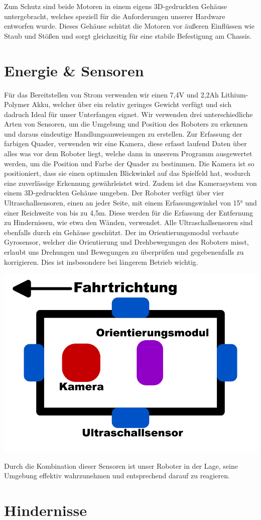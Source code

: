 \documentclass{article}
\begin{document}
Zum Schutz sind beide Motoren in einem eigens 3D-gedruckten Gehäuse untergebracht,
welches speziell für die Anforderungen unserer Hardware entworfen wurde.
Dieses Gehäuse schützt die Motoren vor äußeren Einflüssen wie Staub und Stößen und sorgt gleichzeitig für eine stabile Befestigung am Chassis.

\section{Energie \& Sensoren}
Für das Bereitstellen von Strom verwenden wir einen 7,4V und 2,2Ah Lithium-Polymer Akku, welcher über ein relativ geringes Gewicht verfügt
und sich dadruch Ideal für unser Unterfangen eignet.\newline
Wir verwenden drei unterschiedliche Arten von Sensoren, um die Umgebung und Position des Roboters zu erkennen und daraus eindeutige Handlungsanweisungen
zu erstellen.\newline
Zur Erfassung der farbigen Quader, verwenden wir eine Kamera, diese erfasst laufend Daten über alles was vor dem Roboter liegt,
welche dann in unserem Programm ausgewertet werden, um die Position und Farbe der Quader zu bestimmen.
Die Kamera ist so positioniert, dass sie einen optimalen Blickwinkel auf das Spielfeld hat,
wodurch eine zuverlässige Erkennung gewährleistet wird.
Zudem ist das Kamerasystem von einem 3D-gedruckten Gehäuse umgeben.\newline
Der Roboter verfügt über vier Ultraschallsensoren, einen an jeder Seite, mit einem Erfassungswinkel von 15°
und einer Reichweite von bis zu 4,5m.
Diese werden für die Erfassung der Entfernung zu Hindernissen, wie etwa den Wänden, verwendet.
Alle Ultraschallsensoren sind ebenfalls durch ein Gehäuse geschützt.\newline
Der im Orientierungsmodul verbaute Gyrosensor, welcher die Orientierung und Drehbewegungen des Roboters misst,
erlaubt uns Drehungen und Bewegungen zu überprüfen und gegebenenfalls zu korrigieren.
Dies ist insbesondere bei längerem Betrieb wichtig.
\begin{center}
  \includegraphics[scale=0.3]{sensoren_position.png}
\end{center} 
Durch die Kombination dieser Sensoren ist unser Roboter in der Lage, seine Umgebung effektiv wahrzunehmen
und entsprechend darauf zu reagieren.

\section{Hindernisse}
\end{document}

